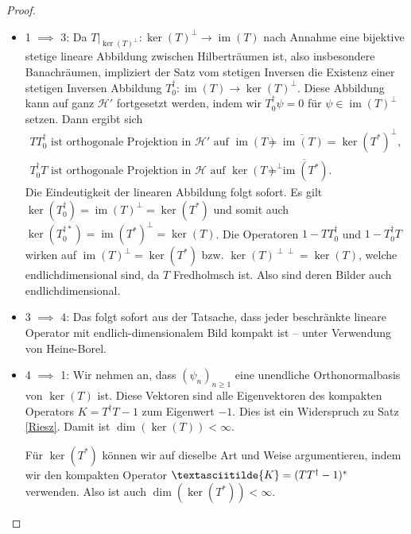 \documentclass[11pt, hidelinks]{article}
\newcommand{\h}{\mathcal{H}}
\newcommand{\im}{\operatorname{im}}
\numberwithin{conj}{section}
\begin{document}
\begin{proof}
\begin{itemize}
    \item 1 $\implies$ 3: Da $T\vert_{\ker(T)^\perp}: \ker(T)^\perp \to \im(T)$ nach Annahme eine bijektive stetige lineare Abbildung zwischen Hilberträumen ist, also insbesondere Banachräumen, impliziert der Satz vom stetigen Inversen \cite[Korollar 3.24]{lechner} die Existenz einer stetigen Inversen Abbildung $T^\dagger_0: \im(T) \to \ker(T)^\perp$. Diese Abbildung kann auf ganz $\h'$ fortgesetzt werden, indem wir $T^\dagger_0 \psi = 0$ für $\psi \in \im(T)^\perp$ setzen. Dann ergibt sich
    \begin{align*}
        TT^\dagger_0  \text{ ist orthogonale Projektion in $\h'$ auf } \im(T) &= \overline{\im(T)} = \ker(T^\ast)^\perp, \\
        T^\dagger_0 T \text{ ist orthogonale Projektion in $\h$ auf } \ker(T)^\perp &= \overline{\im(T^\ast)}.
    \end{align*}
    Die Eindeutigkeit der linearen Abbildung folgt sofort. Es gilt $\ker(T_0^\dagger) = \im(T)^\perp = \ker(T^\ast)$ und somit auch $\ker(T_0^{\dagger\ast}) = \im(T^\ast)^\perp = \ker(T)$. Die Operatoren $1-TT^\dagger_0$ und $1-T^\dagger_0 T$ wirken auf $\im(T)^\perp = \ker(T^\ast)$ bzw. $\ker(T)^{\perp\perp} = \ker(T)$, welche endlichdimensional sind, da $T$ Fredholmsch ist. Also sind deren Bilder auch endlichdimensional.
    \item 3 $\implies$ 4: Das folgt sofort aus der Tatsache, dass jeder beschränkte lineare Operator mit endlich-dimensionalem Bild kompakt ist -- unter Verwendung von Heine-Borel.
    \item 4 $\implies$ 1: Wir nehmen an, dass $(\psi_n)_{n \geq 1}$ eine unendliche Orthonormalbasis von $\ker(T)$ ist. Diese Vektoren sind alle Eigenvektoren des kompakten Operators $K = T^\dagger T -1$ zum Eigenwert $-1$. Dies ist ein Widerspruch zu Satz \ref{Riesz}. Damit ist $\dim(\ker(T)) < \infty$.

    Für $\ker(T^\ast)$ können wir auf dieselbe Art und Weise argumentieren, indem wir den kompakten Operator $\textasciitilde{K} = (TT^\dagger -1)^\ast$ verwenden. Also ist auch $\dim(\ker(T^\ast)) < \infty$.


\end{itemize}
\end{proof}
\end{document}
